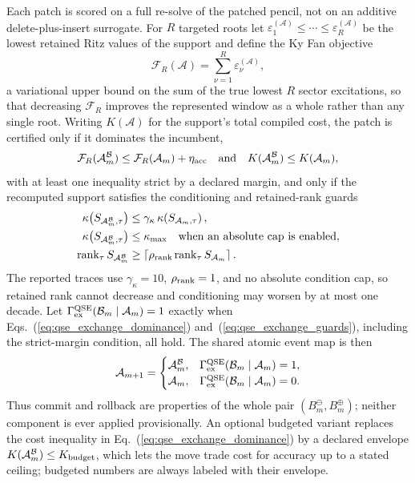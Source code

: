 \documentclass[
  reprint,
  amsmath,
  amssymb,
  aps,
  pra,
  nofootinbib,
  superscriptaddress,
  floatfix
]{revtex4-2}
\newcommand{\Acal}{\mathcal{A}}
\newcommand{\Fcal}{\mathcal{F}}
\newcommand{\qse}{\mathrm{QSE}}
\begin{document}
Each patch is scored on a full re-solve of the patched pencil, not on an additive delete-plus-insert surrogate.  For $R$ targeted roots let $\varepsilon_1^{(\Acal)}\le\cdots\le\varepsilon_R^{(\Acal)}$ be the lowest retained Ritz values of the support and define the Ky Fan objective
\begin{equation}
\Fcal_R(\Acal)=\sum_{\nu=1}^{R}\varepsilon_\nu^{(\Acal)},
\label{eq:qse_kyfan}
\end{equation}
a variational upper bound on the sum of the true lowest $R$ sector excitations, so that decreasing $\Fcal_R$ improves the represented window as a whole rather than any single root.  Writing $K(\Acal)$ for the support's total compiled cost, the patch is certified only if it dominates the incumbent,
\begin{equation}
\Fcal_R(\Acal_m^{\mathcal B})\le\Fcal_R(\Acal_m)+\eta_{\rm acc}
\quad\text{and}\quad
K(\Acal_m^{\mathcal B})\le K(\Acal_m),
\label{eq:qse_exchange_dominance}
\end{equation}
with at least one inequality strict by a declared margin, and only if the recomputed support satisfies the conditioning and retained-rank guards
\begin{equation}
\begin{aligned}
\kappa\!\left(S_{\Acal_m^{\mathcal B},\tau}\right)
&\le
\gamma_\kappa\,
\kappa\!\left(S_{\Acal_m,\tau}\right),
\\
\kappa\!\left(S_{\Acal_m^{\mathcal B},\tau}\right)
&\le\kappa_{\max}
\quad\text{when an absolute cap is enabled},
\\
\operatorname{rank}_\tau S_{\Acal_m^{\mathcal B}}
&\ge
\left\lceil
\rho_{\rm rank}\operatorname{rank}_\tau S_{\Acal_m}
\right\rceil .
\end{aligned}
\label{eq:qse_exchange_guards}
\end{equation}
The reported traces use $\gamma_\kappa=10$, $\rho_{\rm rank}=1$, and no absolute condition cap, so retained rank cannot decrease and conditioning may worsen by at most one decade.
Let $\Gamma_{\rm ex}^{\qse}(\mathcal B_m\mid\Acal_m)=1$ exactly when Eqs.~(\ref{eq:qse_exchange_dominance}) and~(\ref{eq:qse_exchange_guards}), including the strict-margin condition, all hold.  The shared atomic event map is then
\begin{equation}
\Acal_{m+1}
=
\begin{cases}
\Acal_m^{\mathcal B},
& \Gamma_{\rm ex}^{\qse}(\mathcal B_m\mid\Acal_m)=1,\\
\Acal_m,
& \Gamma_{\rm ex}^{\qse}(\mathcal B_m\mid\Acal_m)=0.
\end{cases}
\label{eq:qse_exchange_event_map}
\end{equation}
Thus commit and rollback are properties of the whole pair $(B_m^{\ominus},B_m^{\oplus})$; neither component is ever applied provisionally.  An optional budgeted variant replaces the cost inequality in Eq.~(\ref{eq:qse_exchange_dominance}) by a declared envelope $K(\Acal_m^{\mathcal B})\le K_{\rm budget}$, which lets the move trade cost for accuracy up to a stated ceiling; budgeted numbers are always labeled with their envelope.
\end{document}
